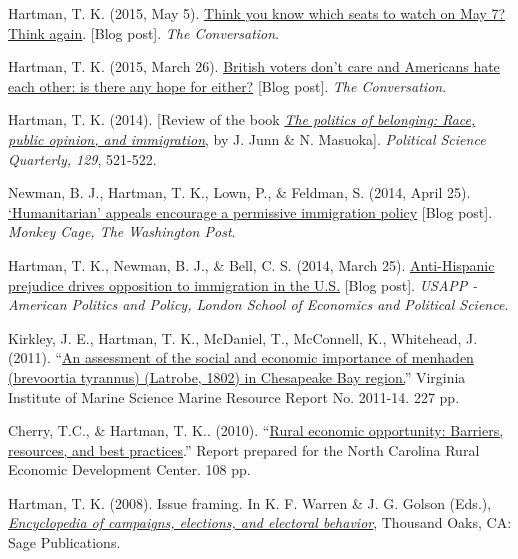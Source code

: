 \documentclass[12pt]{article}
\begin{document}
\begin{bibenum}
    \item Hartman, T. K. (2015, May 5). 
    \href{https://theconversation.com/think-you-know-which-seats-to-watch-on-may-7-think-again-41073}
    {Think you know which seats to watch on May 7? Think again}. [Blog post]. 
    \textit{The Conversation}.

    \item Hartman, T. K. (2015, March 26). 
    \href{https://theconversation.com/british-voters-dont-care-and-americans-hate-each-other-is-there-any-hope-for-either-39279}
    {British voters don't care and Americans hate each other: is there any hope for either?} [Blog post]. 
    \textit{The Conversation}.

	\item Hartman, T. K. (2014). [Review of the book 
    \href{http://onlinelibrary.wiley.com/doi/10.1002/polq.12227/abstract}	
	{\emph{The politics of belonging: Race, public opinion, and immigration}}, 
		by J. Junn \& N. Masuoka]. \emph{Political 
		Science Quarterly, 129}, 521-522.
		
	\item Newman, B. J., {Hartman, T. K.}, Lown, P., \& Feldman, S. (2014, April 25). 
	\href{http://www.washingtonpost.com/blogs/monkey-cage/wp/2014/04/25/humanitarian-appeals-encourage-a-permissive-immigration-policy/}
		{`Humanitarian' appeals encourage a permissive immigration policy} [Blog post]. 
		\textit{Monkey Cage, The Washington Post}.
		
	\item {Hartman, T. K.}, Newman, B. J., \& Bell, C. S. (2014, March 25). 
	\href{http://eprints.lse.ac.uk/58765/}
	{Anti-Hispanic prejudice drives opposition to immigration in the U.S.} [Blog post]. 
	\textit{USAPP - American Politics and Policy, London School of Economics and Political Science}.

	\item Kirkley, J. E., {Hartman, T. K.}, McDaniel, T., McConnell, K., Whitehead, J. (2011).
	``\href{http://web.vims.edu/GreyLit/VIMS/mrr11-14.pdf}
	{An assessment of the social and economic importance 
   of menhaden (brevoortia tyrannus) (Latrobe, 1802) in Chesapeake Bay region.}''    
    Virginia Institute of Marine Science Marine Resource Report No. 2011-14. 227 pp.
    
    \item Cherry, T.C., \& {Hartman, T. K.}. (2010).
    ``\href{http://tkhartman.staff.shef.ac.uk/_content/documents/Cherry.Hartman.2010.pdf}
    {Rural economic opportunity: Barriers, resources, and best practices}.'' 
    Report prepared for the North Carolina Rural Economic Development Center.  108 pp.
	
    \item Hartman, T. K. (2008). Issue framing. 
          In K. F. Warren \& J. G. Golson (Eds.),
          \href{http://www.sagepub.com/books/Book231694}
          {\emph{Encyclopedia of campaigns, elections, and electoral behavior}}, 
          Thousand Oaks, CA: Sage Publications.
\end{bibenum}
\end{document}
